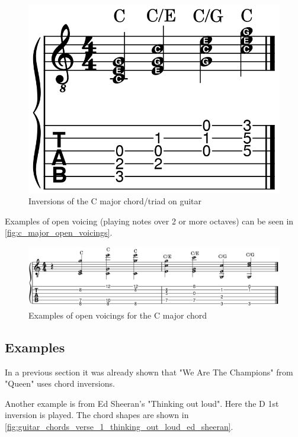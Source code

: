 \begin{figure}[h]
	\centering
	\includegraphics[height=0.13\textheight]{../../MuseScore/Guitar/CMajorInversions.png}
	\caption{Inversions of the C major chord/triad on guitar}
	\label{fig:c_major_inversions}
\end{figure}

Examples of open voicing (playing notes over 2 or more octaves) can be seen in \autoref{fig:c_major_open_voicings}.

\begin{figure}[h]
	\centering
	\includegraphics[height=0.13\textheight]{../../MuseScore/Guitar/CMajorOpenVoicings.png}
	\caption{Examples of open voicings for the C major chord}
	\label{fig:c_major_open_voicings}
\end{figure}

\newpage

\subsection{Examples}

In a previous section it was already shown that "We Are The Champions" from "Queen" uses chord inversions.

Another example is from Ed Sheeran's "Thinking out loud". Here the D 1st inversion is played. The chord shapes are shown in \autoref{fig:guitar_chords_verse_1_thinking_out_loud_ed_sheeran}.

